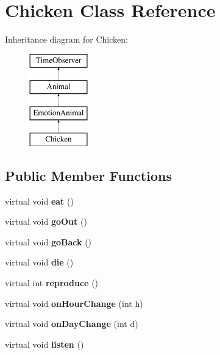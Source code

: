 \hypertarget{class_chicken}{}\section{Chicken Class Reference}
\label{class_chicken}
Inheritance diagram for Chicken\+:\begin{figure}[H]
\begin{center}
\leavevmode
\includegraphics[height=4.000000cm]{class_chicken}
\end{center}
\end{figure}
\subsection*{Public Member Functions}
\begin{DoxyCompactItemize}
\item 
\mbox{\label{class_chicken_aa97cec0b7d3f0e781b201b6e266334f2}} 
virtual void {\bfseries eat} ()
\item 
\mbox{\label{class_chicken_a327d90f77808e083af04dd9c0f7546f2}} 
virtual void {\bfseries go\+Out} ()
\item 
\mbox{\label{class_chicken_a7c8af6c0cb050c3d0ce2ce9809ead79d}} 
virtual void {\bfseries go\+Back} ()
\item 
\mbox{\label{class_chicken_a30db8f1a04f6aa3a4996664e81698f61}} 
virtual void {\bfseries die} ()
\item 
\mbox{\label{class_chicken_ac967d103a38f616fe48743b7c1fa5118}} 
virtual int {\bfseries reproduce} ()
\item 
\mbox{\label{class_chicken_ab27dad98951f0189fc8e83ca517667c4}} 
virtual void {\bfseries on\+Hour\+Change} (int h)
\item 
\mbox{\label{class_chicken_abd9246cbceeba80e73010e421694d3a4}} 
virtual void {\bfseries on\+Day\+Change} (int d)
\item 
\mbox{\label{class_chicken_ab9fccf0929444a4b96baf20fc783a979}} 
virtual void {\bfseries listen} ()
\end{DoxyCompactItemize}
